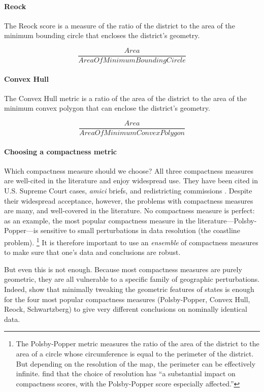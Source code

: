 \documentclass[]{article}
\let\oldparagraph\paragraph
\renewcommand{\paragraph}[1]{\oldparagraph{#1}\mbox{}}
\begin{document}
\hypertarget{reock}{%
\paragraph{Reock}\label{reock}}

The Reock score is a measure of the ratio of the district to the area of
the minimum bounding circle that encloses the district's geometry.

\[\frac{Area}{AreaOfMinimumBoundingCircle}\]

\hypertarget{convex-hull}{%
\paragraph{Convex Hull}\label{convex-hull}}

The Convex Hull metric is a ratio of the area of the district to the
area of the minimum convex polygon that can enclose the district's
geometry.

\[\frac{Area}{AreaOfMinimumConvexPolygon}\]

\hypertarget{choosing-a-compactness-metric}{%
\paragraph{Choosing a compactness
metric}\label{choosing-a-compactness-metric}}

Which compactness measure should we choose? All three compactness
measures are well-cited in the literature and enjoy widespread use. They
have been cited in U.S. Supreme Court cases, \emph{amici} briefs, and
redistricting commissions \citep{moncrief2011}. Despite their widespread
acceptance, however, the problems with compactness measures are many,
and well-covered in the literature. No compactness measure is perfect:
as an example, the most popular compactness measure in the
literature---Polsby-Popper---is sensitive to small perturbations in data
resolution (the coastline problem). \footnote{The Polsby-Popper metric
  measures the ratio of the area of the district to the area of a circle
  whose circumference is equal to the perimeter of the district. But
  depending on the resolution of the map, the perimeter can be
  effectively infinite. \citeauthor{bswp} find that the choice of
  resolution has ``a substantial impact on compactness scores, with the
  Polsby-Popper score especially affected.''} It is therefore important
to use an \emph{ensemble} of compactness measures to make sure that
one's data and conclusions are robust.

But even this is not enough. Because most compactness measures are
purely geometric, they are all vulnerable to a specific family of
geographic perturbations. Indeed, \cite{bswp} show that minimally
tweaking the geometric features of states is enough for the four most
popular compactness measures (Polsby-Popper, Convex Hull, Reock,
Schwartzberg) to give very different conclusions on nominally identical
data.
\end{document}
